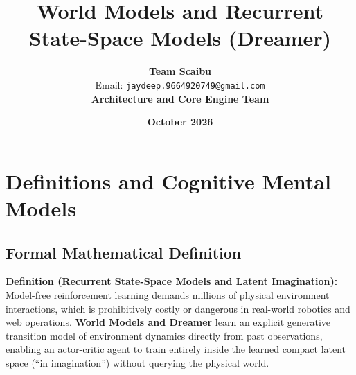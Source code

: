\documentclass[11pt,a4paper]{article}
\title{\textbf{World Models and Recurrent State-Space Models (Dreamer)}}
\author{\textbf{Team Scaibu} \\ \small Email: \texttt{jaydeep.9664920749@gmail.com} \\ \small \textbf{Architecture and Core Engine Team}}
\date{\textbf{October 2026}}
\theoremstyle{definition}
\begin{document}
\maketitle

\section{Definitions and Cognitive Mental Models}

\subsection{Formal Mathematical Definition}
\textbf{Definition (Recurrent State-Space Models and Latent Imagination):}
Model-free reinforcement learning demands millions of physical environment interactions, which is prohibitively costly or dangerous in real-world robotics and web operations. \textbf{World Models and Dreamer} learn an explicit generative transition model of environment dynamics directly from past observations, enabling an actor-critic agent to train entirely inside the learned compact latent space (``in imagination'') without querying the physical world.
\end{document}
